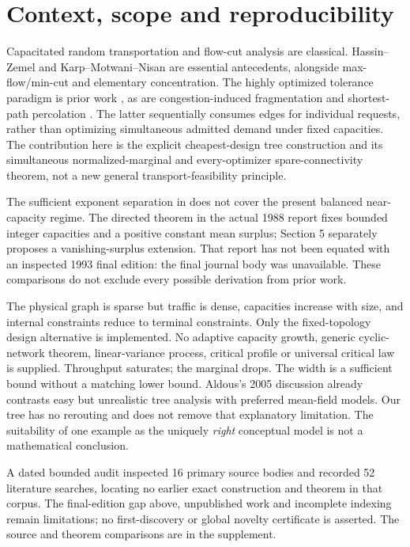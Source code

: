 \documentclass[10pt]{article}
\begin{document}
\section{Context, scope and reproducibility}
Capacitated random transportation and flow-cut analysis are classical.
Hassin--Zemel \cite{HZ} and Karp--Motwani--Nisan \cite{KMN,KMNreport} are
essential antecedents, alongside max-flow/min-cut and elementary concentration.
The highly optimized tolerance paradigm is prior work \cite{CD}, as are
congestion-induced fragmentation and shortest-path percolation \cite{KR}.
The latter sequentially consumes edges for individual requests, rather than
optimizing simultaneous admitted demand under fixed capacities.
The contribution here is the explicit cheapest-design tree construction and
its simultaneous normalized-marginal and every-optimizer spare-connectivity
theorem, not a new general transport-feasibility principle.

The sufficient exponent separation in \cite[Theorem 1]{HZ} does not cover
the present balanced near-capacity regime. The directed theorem in the actual
1988 report \cite[Section 4]{KMNreport} fixes bounded integer capacities
and a positive constant mean surplus; Section 5 separately proposes a
vanishing-surplus extension. That report has not been equated with an inspected
1993 final edition: the final journal body \cite{KMN} was unavailable.
These comparisons do not exclude every possible derivation from prior work.

The physical graph is sparse but traffic is dense, capacities increase with
size, and internal constraints reduce to terminal constraints. Only the
fixed-topology design alternative is implemented. No adaptive capacity growth,
generic cyclic-network theorem, linear-variance process, critical profile or
universal critical law is supplied. Throughput saturates; the marginal drops.
The width is a sufficient bound without a matching lower bound. Aldous's
2005 discussion \cite[slide 5]{Atalk} already contrasts easy but unrealistic
tree analysis with preferred mean-field models. Our tree has no rerouting
and does not remove that explanatory limitation.
The suitability of one example as the uniquely \emph{right} conceptual model
is not a mathematical conclusion.

A dated bounded audit inspected 16 primary source bodies and recorded
52 literature searches, locating no earlier exact construction and theorem
in that corpus. The final-edition gap above, unpublished work and incomplete
indexing remain limitations; no first-discovery or global novelty certificate
is asserted. The source and theorem comparisons are in the supplement.
\end{document}

